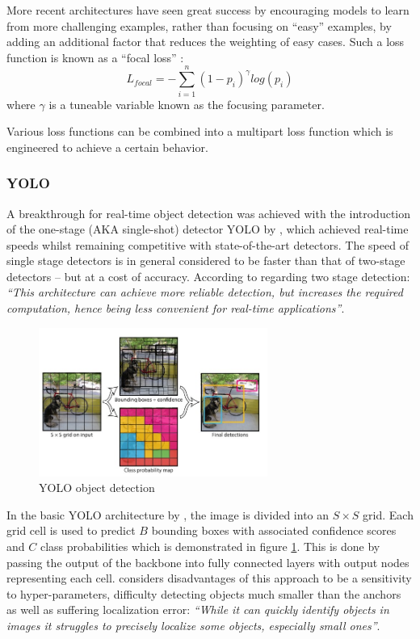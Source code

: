 \documentclass[a4paper,twoside,12pt]{report}
\begin{document}
More recent architectures have seen great success by encouraging models to learn from more challenging examples, rather than focusing on ``easy'' examples, by adding an additional factor that reduces the weighting of easy cases. Such a loss function is known as a ``focal loss'' \citep{focal}:
\begin{equation}
L_{focal} = -\sum_{i=1}^{n} (1-p_i)^\gamma log(p_i)
\end{equation} 
where $\gamma$ is a tuneable variable known as the focusing parameter.

Various loss functions can be combined into a multipart loss function which is engineered to achieve a certain behavior.

\subsubsection{YOLO}

A breakthrough for real-time object detection was achieved with the introduction of the one-stage (AKA single-shot) detector YOLO by \cite{yolo}, which achieved real-time speeds whilst remaining competitive with state-of-the-art detectors. The speed of single stage detectors is in general considered to be faster than that of two-stage detectors -- but at a cost of accuracy. According to \cite{stagecomp} regarding two stage detection: \textit{``This architecture can achieve more reliable detection, but increases the required computation, hence being less convenient for real-time applications''}. 

\begin{figure}[h!]
\begin{center}
\includegraphics[width=7.5cm]{images/yolodemo.jpg}
\caption{YOLO object detection \citep{yolo}}
\label{fig:yolodemo}
\end{center}
\end{figure}

In the basic YOLO architecture by \cite{yolo}, the image is divided into an $S \times S$ grid. Each grid cell is used to predict $B$ bounding boxes with associated confidence scores and $C$ class probabilities which is demonstrated in figure \ref{fig:yolodemo}. This is done by passing the output of the backbone into fully connected layers with output nodes representing each cell. \cite{yolo} considers disadvantages of this approach to be a sensitivity to hyper-parameters, difficulty detecting objects much smaller than the anchors as well as suffering localization error: \textit{``While it can quickly identify objects in images it struggles to precisely localize some objects, especially small ones''}. 
\end{document}
